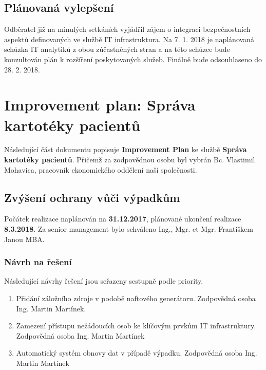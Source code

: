 \documentclass[11pt, a4paper, titlepage]{article}
\begin{document}
	\subsection{Plánovaná vylepšení}

	Odběratel již na minulých setkáních vyjádřil zájem o integraci bezpečnostních aspektů definovaných ve službě IT infrastruktura. Na 7. 1. 2018 je naplánovaná schůzka IT analytiků z obou zúčastněných stran a na této schůzce bude konzultován plán k rozšíření poskytovaných služeb. Finálně bude odsouhlaseno do 28. 2. 2018. 


	\section*{Improvement plan: Správa kartotéky pacientů}

	\vspace{0.5em}

	\noindent Následující část dokumentu popisuje \textbf{Improvement Plan} ke službě \textbf{Správa kartotéky pacientů}. Přičemž za zodpovědnou osobu byl vybrán Bc. Vlastimil Mohavica, pracovník ekonomického oddělení naší společnosti.

	\noindent\makebox[\linewidth]{\rule{17.5cm}{0.4pt}}

	\subsection{Zvýšení ochrany vůči výpadkům}

	Počátek realizace naplánován na \textbf{31.12.2017}, plánované ukončení realizace \textbf{8.3.2018}. Za senior management bylo schváleno Ing., Mgr. et Mgr. Františkem Janou MBA.

	\subsubsection{Návrh na řešení}

	Následující návrhy řešení jsou seřazeny sestupně podle priority.

	\begin{enumerate}
		\item Přidání záložního zdroje v podobě naftového generátoru. Zodpovědná osoba Ing. Martin Martínek.
		\item Zamezení přístupu nežádoucích osob ke klíčovým prvkům IT infrastruktury. Zodpovědná osoba Ing. Martin Martínek
		\item Automatický systém obnovy dat v případě výpadku. Zodpovědná osoba Ing. Martin Martínek
	\end{enumerate}
\end{document}
